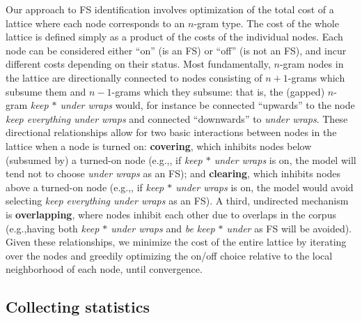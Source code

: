 \documentclass[11pt]{article}
\makeatletter
\def \eg {e.g.,\@ }
\newcommand{\gap}{$*$\xspace}
\newcommand{\ex}[1]{\textit{#1}\xspace}
\newcommand{\termdef}[1]{\textbf{#1}\xspace}
\makeatother
\begin{document}
Our approach to FS identification involves optimization of the total cost of a lattice where each node corresponds to an $n$-gram type. The cost of the whole lattice is defined simply as a product of the costs of the individual nodes. Each node can be considered either ``on'' (is an FS) or ``off'' (is not an FS), and incur different costs depending on their status. Most fundamentally, $n$-gram nodes in the lattice are directionally connected to nodes consisting of $n+1$-grams which subsume them and $n-1$-grams which they subsume: that is, the (gapped) $n$-gram \ex{keep \gap under wraps} would, for instance be connected ``upwards'' to the node \ex{keep everything under wraps} and connected ``downwards'' to \ex{under wraps}. These directional relationships allow for two basic interactions between nodes in the lattice when a node is turned on: \termdef{covering}, which inhibits nodes below (subsumed by) a turned-on node (\eg, if \ex{keep \gap under wraps} is on, the model will tend not to choose \ex{under wraps} as an FS); and \termdef{clearing}, which inhibits nodes above a turned-on node (\eg, if \ex{keep \gap under wraps} is on, the model would avoid selecting \ex{keep everything under wraps} as an FS). A third, undirected mechanism is \termdef{overlapping}, where nodes inhibit each other due to overlaps in the corpus (\eg having both \ex{keep \gap under wraps} and \ex{be keep \gap under} as FS will be avoided). Given these relationships, we minimize the cost of the entire lattice by iterating over the nodes and greedily optimizing the on/off choice relative to the local neighborhood of each node, until convergence.

\subsection{Collecting statistics}
\end{document}
